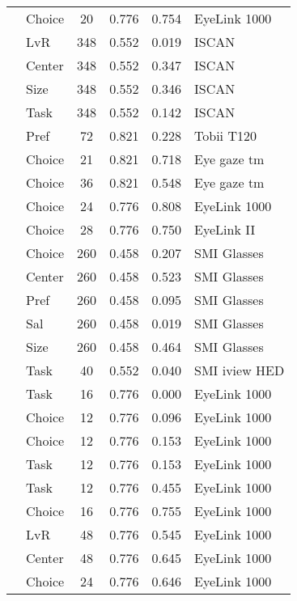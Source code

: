 \begin{longtable}{p{8cm}lcccl}
  \cite{cavanagh2014} & Choice & 20 & 0.776 & 0.754 & EyeLink 1000 \\ 
  \cite{chandon2009a} & LvR & 348 & 0.552 & 0.019 & ISCAN \\ 
  \cite{chandon2009a} & Center & 348 & 0.552 & 0.347 & ISCAN \\ 
  \cite{chandon2009a} & Size & 348 & 0.552 & 0.346 & ISCAN \\ 
  \cite{chandon2009a} & Task & 348 & 0.552 & 0.142 & ISCAN \\ 
  \cite{du2014} & Pref & 72 & 0.821 & 0.228 & Tobii T120 \\ 
  \cite{fiedler2012} & Choice & 21 & 0.821 & 0.718 & Eye gaze tm \\ 
  \cite{fiedler2012} & Choice & 36 & 0.821 & 0.548 & Eye gaze tm \\ 
  \cite{folke2016} & Choice & 24 & 0.776 & 0.808 & EyeLink 1000 \\ 
  \cite{folke2016} & Choice & 28 & 0.776 & 0.750 & EyeLink II \\ 
  \cite{gidloef2017a} & Choice & 260 & 0.458 & 0.207 & SMI Glasses \\ 
  \cite{gidloef2017a} & Center & 260 & 0.458 & 0.523 & SMI Glasses \\ 
  \cite{gidloef2017a} & Pref & 260 & 0.458 & 0.095 & SMI Glasses \\ 
  \cite{gidloef2017a} & Sal & 260 & 0.458 & 0.019 & SMI Glasses \\ 
  \cite{gidloef2017a} & Size & 260 & 0.458 & 0.464 & SMI Glasses \\ 
  \cite{gidlof2013} & Task & 40 & 0.552 & 0.040 & SMI iview HED \\ 
  \cite{glaholt2009a} & Task & 16 & 0.776 & 0.000 & EyeLink 1000 \\ 
  \cite{glaholt2009b} & Choice & 12 & 0.776 & 0.096 & EyeLink 1000 \\ 
  \cite{glaholt2009b} & Choice & 12 & 0.776 & 0.153 & EyeLink 1000 \\ 
  \cite{glaholt2009b} & Task & 12 & 0.776 & 0.153 & EyeLink 1000 \\ 
  \cite{glaholt2009b} & Task & 12 & 0.776 & 0.455 & EyeLink 1000 \\ 
  \cite{glaholt2009c} & Choice & 16 & 0.776 & 0.755 & EyeLink 1000 \\ 
  \cite{glaholt2010} & LvR & 48 & 0.776 & 0.545 & EyeLink 1000 \\ 
  \cite{glaholt2010} & Center & 48 & 0.776 & 0.645 & EyeLink 1000 \\ 
  \cite{glaholt2012} & Choice & 24 & 0.776 & 0.646 & EyeLink 1000 \\ 

\end{longtable}
